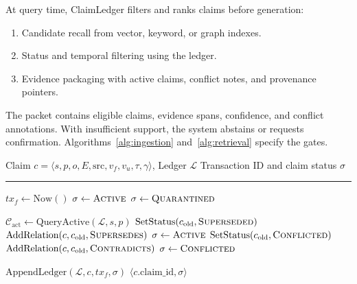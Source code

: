 At query time, ClaimLedger filters and ranks claims before generation:

\begin{enumerate}
\item Candidate recall from vector, keyword, or graph indexes.
\item Status and temporal filtering using the ledger.
\item Evidence packaging with active claims, conflict notes, and provenance pointers.
\end{enumerate}

The packet contains eligible claims, evidence spans, confidence, and conflict annotations. With insufficient support, the system abstains or requests confirmation. Algorithms~\ref{alg:ingestion} and~\ref{alg:retrieval} specify the gates.

\begin{algorithm}[!t]
\caption{Claim Ingestion \& Lifecycle Governance}
\label{alg:ingestion}
\begin{algorithmic}[1]
\Require Claim $c = \langle s, p, o, E, \text{src}, v_f, v_u, \tau, \gamma \rangle$, Ledger $\mathcal{L}$
\Ensure Transaction ID and claim status $\sigma$
\vspace{2pt}
\hrule
\vspace{3pt}

\State $tx_f \gets \text{Now}()$
    \State $\sigma \gets \text{\textsc{Active}}$ \hfill {}
\Else
    \State $\sigma \gets \text{\textsc{Quarantined}}$ \hfill {}
\EndIf
\vspace{3pt}

\State $\mathcal{C}_{\text{act}} \gets \text{QueryActive}(\mathcal{L}, s, p)$
            \State $\text{SetStatus}(c_{\text{old}}, \text{\textsc{Superseded}})$
            \State $\text{AddRelation}(c, c_{\text{old}}, \text{\textsc{Supersedes}})$
            \State $\sigma \gets \text{\textsc{Active}}$
            \State $\text{SetStatus}(c_{\text{old}}, \text{\textsc{Conflicted}})$
            \State $\text{AddRelation}(c, c_{\text{old}}, \text{\textsc{Contradicts}})$
            \State $\sigma \gets \text{\textsc{Conflicted}}$
        \EndIf
    \EndIf
\EndFor
\vspace{3pt}

\State $\text{AppendLedger}(\mathcal{L}, c, tx_f, \sigma)$
\State \Return $\langle c.\text{claim\_id}, \sigma \rangle$
\end{algorithmic}
\end{algorithm}

